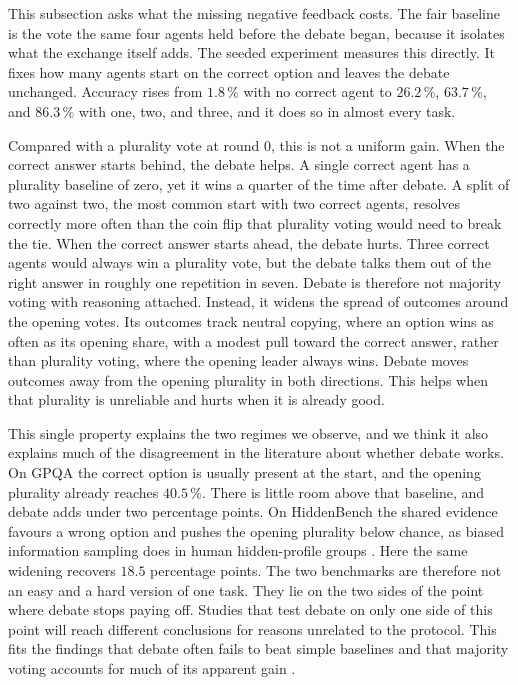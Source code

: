 This subsection asks what the missing negative feedback costs. The fair baseline
is the vote the same four agents held before the debate began, because it
isolates what the exchange itself adds. The seeded experiment measures this
directly. It fixes how many agents start on the correct option and leaves the
debate unchanged. Accuracy rises from $1.8\,\%$ with no correct agent to
$26.2\,\%$, $63.7\,\%$, and $86.3\,\%$ with one, two, and three, and it does so
in almost every task.

Compared with a plurality vote at round $0$, this is not a uniform gain. When the
correct answer starts behind, the debate helps. A single correct agent has a
plurality baseline of zero, yet it wins a quarter of the time after debate. A
split of two against two, the most common start with two correct agents,
resolves correctly more often than the coin flip that
plurality voting would need to break the tie. When the correct answer starts
ahead, the debate hurts. Three correct agents would always win a plurality vote,
but the debate talks them out of the right answer in roughly one repetition in
seven. Debate is therefore not majority voting with reasoning attached. Instead, it
widens the spread of outcomes around the opening votes. Its outcomes track neutral
copying, where an option wins as often as its opening share, with a modest pull
toward the correct answer, rather than plurality voting, where the opening
leader always wins. Debate moves outcomes away from the
opening plurality in both directions. This helps when that plurality is
unreliable and hurts when it is already good.

This single property explains the two regimes we observe, and we think it also
explains much of the disagreement in the literature about whether debate works.
On GPQA the correct option is usually present at the start, and the opening
plurality already reaches $40.5\,\%$. There is little room above that baseline,
and debate adds under two percentage points. On HiddenBench the shared evidence
favours a wrong option and pushes the opening plurality below chance, as biased
information sampling does in human hidden-profile groups
\citep{stasser1985pooling, li2026hiddenbench}. Here the same widening recovers
$18.5$ percentage points. The two benchmarks are therefore not an easy and a hard
version of one task. They lie on the two sides of the point where debate stops
paying off. Studies that test debate on only one side of this point will reach
different conclusions for reasons unrelated to the protocol. This fits the
findings that debate often fails to beat simple baselines
\citep{liu2025stopovervaluing} and that majority voting accounts for much of its
apparent gain \citep{zhang2025debateorvote}.

